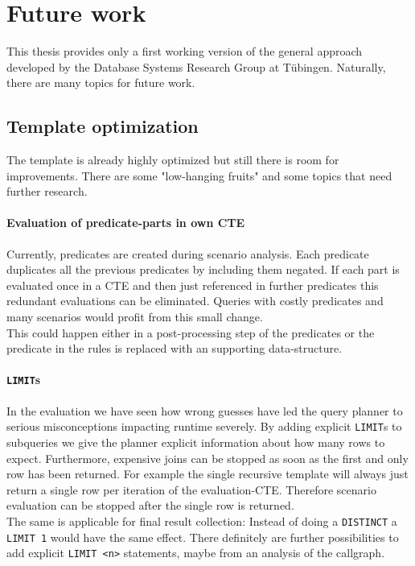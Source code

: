 



\section{Future work}

This thesis provides only a first working version of the general approach developed by the Database Systems Research Group at Tübingen. Naturally, there are many topics for future work.

\subsection{Template optimization}
The template is already highly optimized but still there is room for improvements. There are some "low-hanging fruits" and some topics that need further research.

\paragraph*{Evaluation of predicate-parts in own CTE}
Currently, predicates are created during scenario analysis. Each predicate duplicates all the previous predicates by including them negated. If each part is evaluated once in a CTE and then just referenced in further predicates this redundant evaluations can be eliminated. Queries with costly predicates and many scenarios would profit from this small change.\\
This could happen either in a post-processing step of the predicates or the predicate in the rules is replaced with an supporting data-structure.

\paragraph*{\texttt{LIMIT}s}
In the evaluation we have seen how wrong guesses have led the query planner to serious misconceptions impacting runtime severely. By adding explicit \texttt{LIMIT}s to subqueries we give the planner explicit information about how many rows to expect. Furthermore, expensive joins can be stopped as soon as the first and only row has been returned. For example the single recursive template will always just return a single row per iteration of the evaluation-CTE. Therefore scenario evaluation can be stopped after the single row is returned.\\
The same is applicable for final result collection: Instead of doing a \texttt{DISTINCT} a \texttt{LIMIT 1} would have the same effect. There definitely are further possibilities to add explicit \texttt{LIMIT <n>} statements, maybe from an analysis of the callgraph.

